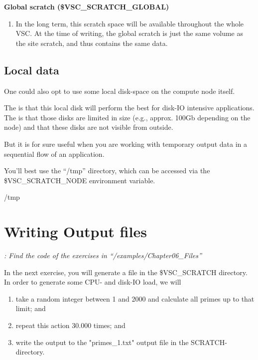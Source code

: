 \textbf{Global scratch (\$VSC\_SCRATCH\_GLOBAL)}
\begin{enumerate}
  \item In the long term, this scratch space will be available throughout the
    whole VSC. At the time of writing, the global scratch is just the same
    volume as the site scratch, and thus contains the same data.
\end{enumerate}

\subsection{Local data}

One could also opt to use some local disk-space on the compute node itself.

The  is that this local disk will perform the best for
disk-IO intensive applications.  The  is that those disks are
limited in size (e.g., approx. 100Gb depending on the node) and that these
disks are not visible from outside.

But it is for sure useful when you are working with temporary output data in a
sequential flow of an application.

You'll best use the ``/tmp'' directory, which can be accessed via the
\$VSC\_SCRATCH\_NODE environment variable.

\begin{prompt}
/tmp
\end{prompt}

\section{Writing Output files}

\textit{: Find the code of the exercises in ``\tilde/examples/Chapter06\_Files''}

In the next exercise, you will generate a file in the \$VSC\_SCRATCH directory.
In order to generate some CPU- and disk-IO load, we will

\begin{enumerate}
\item  take a random integer between 1 and 2000 and calculate all primes up to that limit; and
\item  repeat this action 30.000 times; and
\item  write the output to the "primes\_1.txt" output file in the SCRATCH-directory.
\end{enumerate}

